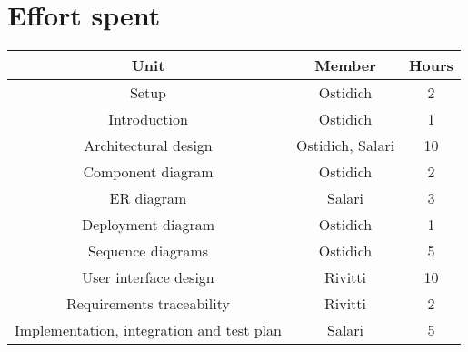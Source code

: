 \chapter{Effort spent}

\begin{table}[h]
    \centering
    \begin{tabular}{|c|c|c|}
        \hline \textbf{Unit} & \textbf{Member} & \textbf{Hours} \\
        \hline Setup & Ostidich & 2 \\
        \hline Introduction & Ostidich & 1 \\
        \hline Architectural design & Ostidich, Salari & 10 \\
        \hline Component diagram & Ostidich & 2 \\
        \hline ER diagram & Salari & 3 \\
        \hline Deployment diagram & Ostidich & 1 \\
        \hline Sequence diagrams & Ostidich & 5 \\
        \hline User interface design & Rivitti & 10 \\
        \hline Requirements traceability & Rivitti & 2 \\
        \hline Implementation, integration and test plan & Salari & 5 \\
        \hline
    \end{tabular}
\end{table}

